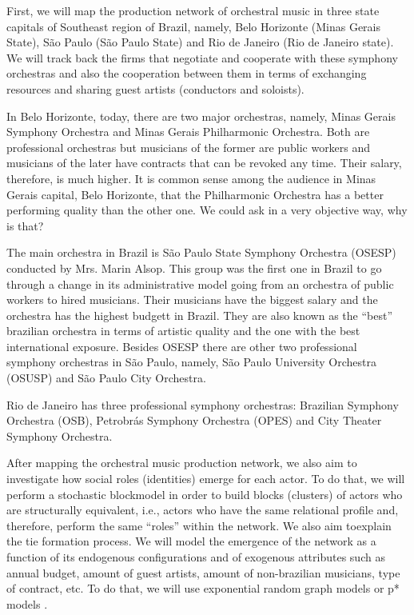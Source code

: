 \documentclass[a4paper, 12pt, openright, oneside, german, french, brazil, english, article]{abntex2}
\begin{document}
	First, we will map the production network of orchestral music in three state capitals of Southeast region of Brazil, namely, Belo Horizonte (Minas Gerais State), São Paulo (São Paulo State) and Rio de Janeiro (Rio de Janeiro state). We will track back the firms that negotiate and cooperate with these symphony orchestras and also the cooperation between them in terms of exchanging resources and sharing guest artists (conductors and soloists).
	
	In Belo Horizonte, today, there are two major orchestras, namely, Minas Gerais Symphony Orchestra and Minas Gerais Philharmonic Orchestra. Both are professional orchestras but musicians of the former are public workers and musicians of the later have contracts that can be revoked any time. Their salary, therefore, is much higher. It is common sense among the audience in Minas Gerais capital, Belo Horizonte, that the Philharmonic Orchestra has a better performing quality than the other one. We could ask in a very objective way, why is that?
	
	The main orchestra in Brazil is São Paulo State Symphony Orchestra (OSESP) conducted by Mrs. Marin Alsop. This group was the first one in Brazil to go through a change in its administrative model going from an orchestra of public workers to hired musicians. Their musicians have the biggest salary and the orchestra has the highest budgett in Brazil. They are also known as the ``best'' brazilian orchestra in terms of artistic quality and the one with the best international exposure. Besides OSESP there are other two professional symphony orchestras in São Paulo, namely, São Paulo University Orchestra (OSUSP) and São Paulo City Orchestra.
	
	Rio de Janeiro has three professional symphony orchestras: Brazilian Symphony Orchestra (OSB), Petrobrás Symphony Orchestra (OPES) and City Theater Symphony Orchestra.
	
	After mapping the orchestral music production network, we also aim to investigate how social roles (identities) emerge for each actor. To do that, we will perform a stochastic blockmodel in order to build blocks (clusters) of actors who are structurally equivalent, i.e., actors who have the same relational profile and, therefore, perform the same ``roles'' within the network. We also aim toexplain the tie formation process. We will model the emergence of the network as a function of its endogenous configurations and of exogenous attributes such as annual budget, amount of guest artists, amount of non-brazilian musicians, type of contract, etc. To do that, we will use exponential random graph models or p* models \cite{lazega2014redes}.
	
\end{document}
